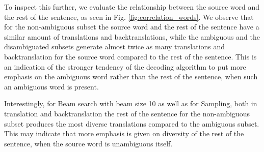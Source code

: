 To inspect this further, we evaluate the relationship between the source word and the rest of the sentence, as seen in Fig. \ref{fig:correlation_words}. We observe that for the non-ambiguous subset the source word and the rest of the sentence have a similar amount of translations and backtranslations, while the ambiguous and the disambiguated subsets generate almost twice as many translations and backtranslation for the source word compared to the rest of the sentence. This is an indication of the stronger tendency of the decoding algorithm to put more emphasis on the ambiguous word rather than the rest of the sentence, when such an ambiguous word is present. 

Interestingly, for Beam search with beam size 10 as well as for Sampling, both in translation and backtranslation the rest of the sentence for the non-ambiguous subset produces the most diverse translations compared to the ambiguous subset. This may indicate that more emphasis is given on diversity of the rest of the sentence, when the source word is unambiguous itself. 

